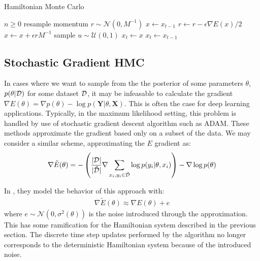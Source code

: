 \begin{algorithm}[H]
    \caption{Hamiltonian Monte Carlo} \label{alg:hmc}
    \begin{algorithmic}
        \Require $n \geq 0$
        \State resample momentum $r \sim \mathcal{N}(0, M^{-1})$
        \State $x \gets x_{t-1}$
        \State $r \gets r - \epsilon \nabla E(x)/2$ 
        \State $x\gets x + \epsilon r M^{-1} $ 
        \EndFor
        \State sample $u \sim \mathcal{U}(0, 1)$
        \State $x_{t} \gets x$
        \Else
        \State $x_{t} \gets x_{t-1}$
        \EndIf
        \EndFor
    \end{algorithmic}
\end{algorithm}


\subsection{Stochastic Gradient HMC}

In cases where we want to sample from the the posterior of some parameters $\theta$,  $p(\theta | \mathcal{D})$ for some dataset $\mathcal{D}$, it may be infeasable to calculate the gradient $\nabla E(\theta) = \nabla p(\theta) - \log{p(\bm{Y} | \theta, \bm{X})}$. 
This is often the case for deep learning applications.
Typically, in the maximum likelihood setting, this problem is handled by use of stochastic gradient descent algorithm such as ADAM. 
These methods approximate the gradient based only on a subset of the data. 
We may consider a similar scheme, approximating the $E$ gradient as:
\begin{align*}
    \nabla\tilde{E}(\theta) = -\left(\frac{|\mathcal{D}|}{|\tilde{\mathcal{D}}|}  \nabla \sum_{x_i, y_i\in \tilde{\mathcal{D}}} \log{p(y_i |\theta, x_i)}\right)  -\nabla \log{p(\theta)}
\end{align*}

In \cite{chen_stochastic_2014}, they model the behavior of this approach with:
\begin{align} \label{eq:sghmc-model}
    \nabla\tilde{E}(\theta) \approx \nabla{E}(\theta) + e
\end{align}
where $e \sim \mathcal{N}(0, \sigma^2(\theta))$ is the noise introduced through the approximation.
This has some ramification for the Hamiltonian system described in the previous section. 
The discrete time step updates performed by the algorithm no longer corresponds to the deterministic Hamiltonian system because of the introduced noise. 

